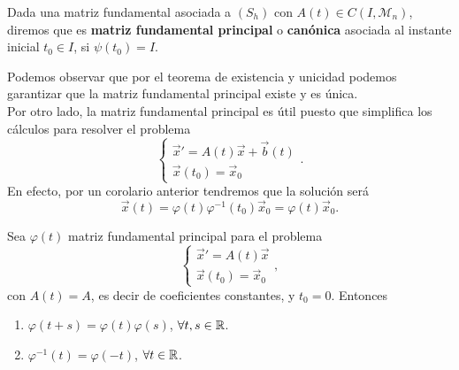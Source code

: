 \begin{definition}
Dada una matriz fundamental asociada a $\displaystyle \left(S_{h}\right) $ con $\displaystyle A\left(t\right)\in C\left(I, \mathcal{M}_{n}\right) $, diremos que es \textbf{matriz fundamental principal} o \textbf{canónica} asociada al instante inicial $\displaystyle t_{0} \in I $, si $\displaystyle \psi\left(t_{0}\right)=I$.
\end{definition}
\begin{observation}
Podemos observar que por el teorema de existencia y unicidad podemos garantizar que la matriz fundamental principal existe y es única. \\
Por otro lado, la matriz fundamental principal es útil puesto que simplifica los cálculos para resolver el problema
\[
\begin{cases}
\vec{x}' = A\left(t\right)\vec{x} + \vec{b}\left(t\right) \\
\vec{x}\left(t_{0}\right)=\vec{x}_{0}
\end{cases}
.\]
En efecto, por un corolario anterior tendremos que la solución será  
\[ \vec{x}\left(t\right)=\varphi\left(t\right)\varphi^{-1}\left(t_{0}\right)\vec{x}_{0}=\varphi\left(t\right)\vec{x}_{0}.\]
\end{observation}
\begin{prop}
Sea $\displaystyle \varphi\left(t\right) $ matriz fundamental principal para el problema
\[
\begin{cases}
\vec{x}' = A\left(t\right)\vec{x} \\
\vec{x}\left(t_{0}\right)=\vec{x}_{0}
\end{cases}
,\]
con $\displaystyle A\left(t\right)=A $, es decir de coeficientes constantes, y $\displaystyle t_{0}=0 $. Entonces
\begin{enumerate}
\item $\displaystyle \varphi\left(t+s\right)=\varphi\left(t\right)\varphi\left(s\right) $, $\displaystyle \forall t,s \in \mathbb{R} $. 
\item $\displaystyle \varphi^{-1}\left(t\right)=\varphi\left(-t\right) $, $\displaystyle \forall t \in \mathbb{R} $. 
\end{enumerate}
\end{prop}
